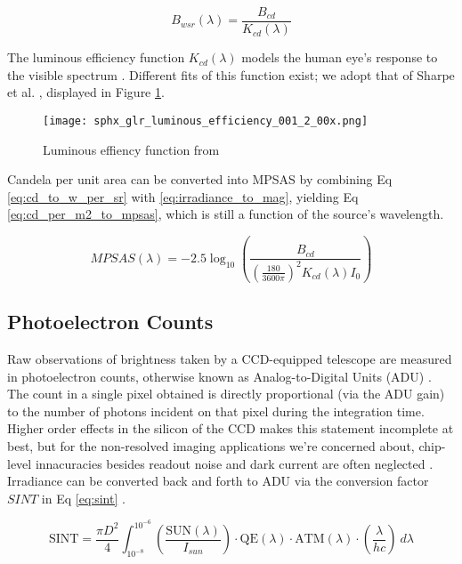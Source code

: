 \begin{equation} \label{eq:cd_to_w_per_sr}
  B_{wsr}(\lambda) = \frac{B_{cd}}{K_{cd}(\lambda)}
\end{equation}

The luminous efficiency function $K_{cd}(\lambda)$ models the human eye's response to the visible spectrum \cite{sharpe2005}. Different fits of this function exist; we adopt that of Sharpe et al. \cite{sharpe2005}, displayed in Figure \ref{fig:luminous_efficiency}.

\begin{figure}[ht]
  \centering
  \texttt{[image: sphx\_glr\_luminous\_efficiency\_001\_2\_00x.png]}
  \caption{Luminous effiency function from \cite{sharpe2005}}
  \label{fig:luminous_efficiency}
\end{figure}

Candela per unit area can be converted into MPSAS by combining Eq \ref{eq:cd_to_w_per_sr} with \ref{eq:irradiance_to_mag}, yielding Eq \ref{eq:cd_per_m2_to_mpsas}, which is still a function of the source's wavelength.

\begin{equation} \label{eq:cd_per_m2_to_mpsas}
  MPSAS(\lambda) = -2.5 \log_{10}\left( \frac{B_{cd}}{\left( \frac{180}{ 3600\pi} \right)^2 K_{cd}(\lambda) I_0} \right)
\end{equation}

\subsection{Photoelectron Counts}

Raw observations of brightness taken by a CCD-equipped telescope are measured in photoelectron
counts, otherwise known as Analog-to-Digital Units (ADU) \cite{krag2003}. The count in a single
pixel obtained is directly proportional (via the ADU gain) to the number of
photons incident on that pixel during the integration time. Higher order effects in the silicon of
the CCD makes this statement incomplete at best, but for the non-resolved imaging applications we're
concerned about, chip-level innacuracies besides readout noise and dark current are often neglected
\cite{frueh2019notes}. Irradiance can be converted back and forth to ADU via the conversion factor $SINT$
in Eq \ref{eq:sint} \cite{krag2003}.

\begin{equation} \label{eq:sint}
 \textrm{SINT} = \frac{\pi D^2}{4}
	\int_{10^{-8}}^{10^{-6}}{ \left( \frac{\textrm{SUN}(\lambda)}{I_{sun}} \right) \cdot \textrm{QE}(\lambda) \cdot \textrm{ATM}(\lambda)
  \cdot \left( \frac{\lambda}{h c} \right) \: d\lambda}  
\end{equation}

